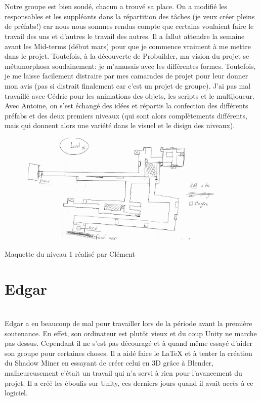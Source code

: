 \documentclass[titlepage, 13px, a4paper]{article}
\begin{document}
\paragraph{} \hspace{0pt} \\
  Notre groupe est bien soudé, chacun a trouvé sa place. On a modifié les responsables et les suppléants dans la 
répartition des tâches (je veux créer pleins de préfabs!) car nous nous sommes rendus compte que certains voulaient faire le 
travail des uns et d'autres le travail des autres. Il a fallut attendre la semaine avant les Mid-terms (début mars) pour que 
je commence vraiment à me mettre dans le projet. Toutefois, à la découverte de Probuilder, ma vision du projet se métamorphosa
soudainement: je m'amusais avec les différentes formes. Toutefois, je me laisse facilement distraire par mes camarades de
projet pour leur donner mon avis (pas si distrait finalement car c'est un projet de groupe). J'ai pas mal travaillé avec Cédric
pour les animations des objets, les scripts et le multijoueur. Avec Antoine, on s'est échangé des idées et répartis la 
confection des différents préfabs et des deux premiers niveaux (qui sont alors complètements différents, mais qui donnent alors
une variété dans le visuel et le disign des niveaux).

\begin{center}
	\begin{figure}[!hp]
	   \includegraphics[width=10cm]{niveau-game.jpg}
	\end{figure}
	Maquette du niveau 1 réalisé par Clément
\end{center}


\section{Edgar}
\paragraph{} \hspace{0pt} \\
Edgar a eu beaucoup de mal pour travailler lors de la période avant la première soutenance.
En effet, son ordinateur est plutôt vieux et du coup Unity ne marche pas dessus. 
Cependant il ne s'est pas découragé et à quand même essayé d'aider son groupe pour certaines choses. 
Il a aidé faire le LaTeX et à tenter la création du Shadow Miner en essayant de créer celui en 3D grâce à Blender, 
malheureusement c'était un travail qui n'a servi à rien pour l'avancement du projet.
Il a créé les éboulis sur Unity, ces derniers jours quand il avait accès à ce logiciel.
\end{document}

